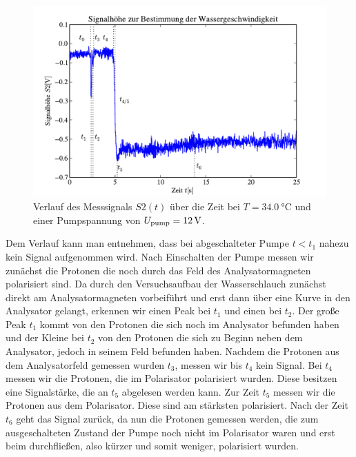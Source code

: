 \documentclass[paper=a4,
	fontsize=10pt,
	DIV=18,
	twocolumn,
	parskip=half
	]{scrartcl}
\numberwithin{equation}{section}    %
\begin{document}
\begin{figure}[htp]
	\begin{center}
		\includegraphics[width=\columnwidth]{Data-Plots/06-wassergeschwindigkeit.pdf}
		\caption{Verlauf des Messsignals $S2(t)$ über die Zeit bei $T=\SI{34.0}{\celsius}$ und einer Pumpspannung von $U_{\rm pump}=\SI{12}{\volt}$.}
		\label{fig.wassergeschwindigkeit}
	\end{center}
\end{figure}

Dem Verlauf kann man entnehmen, dass bei abgeschalteter Pumpe $t<t_1$ nahezu kein Signal aufgenommen wird. Nach Einschalten der Pumpe messen wir zunächst die Protonen die noch durch das Feld des Analysatormagneten polarisiert sind. Da durch den Versuchsaufbau der Wasserschlauch zunächst direkt am Analysatormagneten vorbeiführt und erst dann über eine Kurve in den Analysator gelangt, erkennen wir einen Peak bei $t_1$ und einen bei $t_2$. Der große Peak $t_1$ kommt von den Protonen die sich noch im Analysator befunden haben und der Kleine bei $t_2$ von den Protonen die sich zu Beginn neben dem Analysator, jedoch in seinem Feld befunden haben. Nachdem die Protonen aus dem Analysatorfeld gemessen wurden $t_3$, messen wir bis $t_4$ kein Signal. Bei $t_4$ messen wir die Protonen, die im Polarisator polarisiert wurden. Diese besitzen eine Signalstärke, die an $t_5$ abgelesen werden kann. Zur Zeit $t_5$ messen wir die Protonen aus dem Polarisator. Diese sind am stärksten polarisiert. Nach der Zeit $t_6$ geht das Signal zurück, da nun die Protonen gemessen werden, die zum ausgeschalteten Zustand der Pumpe noch nicht im Polarisator waren und erst beim durchfließen, also kürzer und somit weniger, polarisiert wurden.
\end{document}
